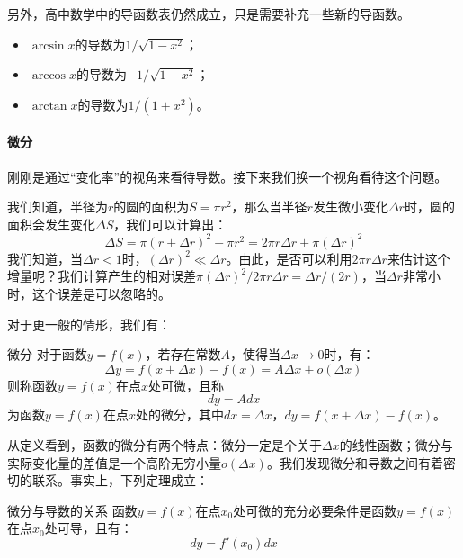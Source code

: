 另外，高中数学中的导函数表仍然成立，只是需要补充一些新的导函数。
\begin{itemize}
    \item $\arcsin x$的导数为$1/\sqrt{1 - x^2}$；
    \item $\arccos x$的导数为$-1/\sqrt{1 - x^2}$；
    \item $\arctan x$的导数为$1/(1 + x^2)$。
\end{itemize}

\paragraph{微分} 刚刚是通过“变化率”的视角来看待导数。接下来我们换一个视角看待这个问题。

我们知道，半径为$r$的圆的面积为$S = \pi r^2$，那么当半径$r$发生微小变化$\Delta r$时，圆的面积会发生变化$\Delta S$，我们可以计算出：
\begin{equation}
    \Delta S = \pi (r + \Delta r)^2 - \pi r^2 = 2\pi r \Delta r + \pi (\Delta r)^2
\end{equation}
我们知道，当$\Delta r < 1$时，$(\Delta r)^2 \ll \Delta r$。由此，是否可以利用$2\pi r \Delta r$来估计这个增量呢？我们计算产生的相对误差$ \pi (\Delta r)^2 / 2\pi r \Delta r = \Delta r / (2r)$，当$\Delta r$非常小时，这个误差是可以忽略的。

对于更一般的情形，我们有：
\begin{definition}{微分}{}
    对于函数$y = f(x)$，若存在常数$A$，使得当$\Delta x \to 0$时，有：
    \begin{equation}
        \Delta y = f(x + \Delta x) - f(x) = A \Delta x + o(\Delta x)
    \end{equation}
    则称函数$y = f(x)$在点$x$处可微，且称
    \begin{equation}
        dy = A dx
    \end{equation}
    为函数$y = f(x)$在点$x$处的微分，其中$dx = \Delta x$，$dy = f(x + \Delta x) - f(x)$。
\end{definition}
从定义看到，函数的微分有两个特点：微分一定是个关于$\Delta x$的线性函数；微分与实际变化量的差值是一个高阶无穷小量$o(\Delta x)$。我们发现微分和导数之间有着密切的联系。事实上，下列定理成立：
\begin{theorem}{微分与导数的关系}{}
    函数$y = f(x)$在点$x_0$处可微的充分必要条件是函数$y = f(x)$在点$x_0$处可导，且有：
    \begin{equation}
        dy = f'(x_0) dx
    \end{equation}
\end{theorem}

